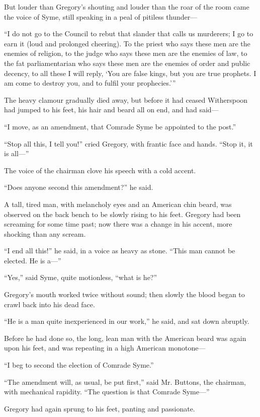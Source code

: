\documentclass{book}
\begin{document}
But louder than Gregory’s shouting and louder than the roar of the room came the voice of Syme, still speaking in a peal of pitiless thunder—

“I do not go to the Council to rebut that slander that calls us murderers; I go to earn it (loud and prolonged cheering). To the priest who says these men are the enemies of religion, to the judge who says these men are the enemies of law, to the fat parliamentarian who says these men are the enemies of order and public decency, to all these I will reply, ‘You are false kings, but you are true prophets. I am come to destroy you, and to fulfil your prophecies.’”

The heavy clamour gradually died away, but before it had ceased Witherspoon had jumped to his feet, his hair and beard all on end, and had said—

“I move, as an amendment, that Comrade Syme be appointed to the post.”

“Stop all this, I tell you!” cried Gregory, with frantic face and hands. “Stop it, it is all—”

The voice of the chairman clove his speech with a cold accent.

“Does anyone second this amendment?” he said.

A tall, tired man, with melancholy eyes and an American chin beard, was observed on the back bench to be slowly rising to his feet. Gregory had been screaming for some time past; now there was a change in his accent, more shocking than any scream.

“I end all this!” he said, in a voice as heavy as stone. “This man cannot be elected. He is a—”

“Yes,” said Syme, quite motionless, “what is he?”

Gregory’s mouth worked twice without sound; then slowly the blood began to crawl back into his dead face.

“He is a man quite inexperienced in our work,” he said, and sat down abruptly.

Before he had done so, the long, lean man with the American beard was again upon his feet, and was repeating in a high American monotone—

“I beg to second the election of Comrade Syme.”

“The amendment will, as usual, be put first,” said Mr. Buttons, the chairman, with mechanical rapidity. “The question is that Comrade Syme—”

Gregory had again sprung to his feet, panting and passionate.
\end{document}
